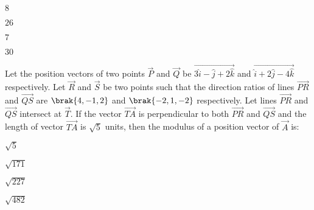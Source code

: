    \hfill{}
    
    \begin{enumerate}
    \begin{multicols}{4}
        \item $8$
        \item $26$
        \item $7$
        \item $30$
    \end{multicols}
    \end{enumerate}

    \item 
    Let the position vectors of two points $\vec{P}$ and $\vec{Q}$ be $\vec{3\hat{i} - \hat{j} + 2\hat{k}}$ and $\vec{\hat{i} + 2\hat{j} - 4\hat{k}}$ respectively. Let $\vec{R}$ and $\vec{S}$ be two points such that the direction ratios of lines $\vec{PR}$ and $\vec{QS}$ are $\brak{4, -1, 2}$ and $\brak{-2,1,-2}$ respectively. Let lines $\vec{PR}$ and $\vec{QS}$ intersect at $\vec{T}$. If the vector $\vec{TA}$ is perpendicular to both $\vec{PR}$ and $\vec{QS}$ and the length of vector $\vec{TA}$ is $\sqrt{5}$ units, then the modulus of a position vector of $\vec{A}$ is:

    \hfill{}
    
    \begin{enumerate}
    \begin{multicols}{4}
        \item $\sqrt{5}$
        \item $\sqrt{171}$
        \item $\sqrt{227}$
        \item $\sqrt{482}$
    \end{multicols}
    \end{enumerate}

    \begin{figure}[H]
        \centering
    \end{figure}

